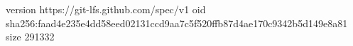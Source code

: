 version https://git-lfs.github.com/spec/v1
oid sha256:faad4e235e4dd58eed02131ccd9aa7c5f520ffb87d4ae170c9342b5d149e8a81
size 291332

